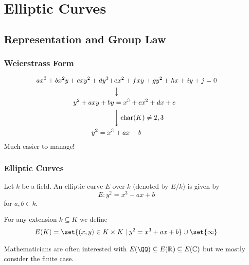 \documentclass{beamer}
\begin{document}
\section{Elliptic Curves}
\subsection{Representation and Group Law}
\begin{frame}
    \frametitle{Weierstrass Form} 
    \begin{align*}
        a x^3 + b x^2 y + c x y^2 + d y^3 +& e x^2 + f x y + g y^2 + h x + i y + j = 0 \\
        &\big\downarrow \\
        y^2 + a xy + b y &= x^3 + c x^2 + d x + e \\
        &\bigg\downarrow \; \mathrm{char}(K) \neq 2, 3 \\
        y^2 = x^3 &+ a x + b
    \end{align*}
    Much easier to manage!
\end{frame}

\begin{frame}
    \frametitle{Elliptic Curves}
    \begin{definition}
        Let $k$ be a field. An elliptic curve $E$ over $k$ (denoted by $E/k$) is given by 
        \[ E: y^2 = x^3 + a x + b \]
        for $a, b \in k$. 
        
        For any extension $k\subseteq K$ we define
        \[ E(K) = \set{(x, y) \in K \times K \mid y^2 = x^3 + a x + b } \cup \set{ \infty } \]
    \end{definition}
    
    Mathematicians are often interested with $E(\QQ) \subseteq E(\mathbb{R}) \subseteq E(\mathbb{C})$ but we mostly consider the finite case.
\end{frame}
\end{document}
